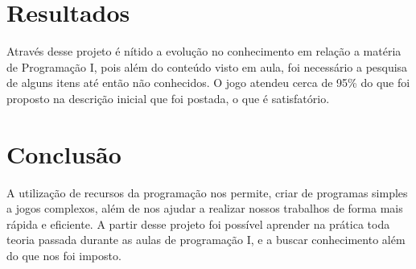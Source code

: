 \documentclass[journal]{IEEEtran}
\begin{document}
\section{Resultados}
Através desse projeto é nítido a evolução no conhecimento em relação a matéria de Programação I, pois além do conteúdo visto em aula, foi necessário a pesquisa de alguns itens até então não conhecidos. O jogo atendeu cerca de 95\% do que foi proposto na descrição inicial que foi postada, o que é satisfatório. 


\section{Conclusão}
A utilização de recursos da programação nos permite, criar de programas simples a jogos complexos, além de nos ajudar a realizar nossos trabalhos de forma mais rápida e eficiente. A partir desse projeto foi possível aprender na prática toda teoria passada durante as aulas de programação I, e a buscar conhecimento além do que nos foi imposto. 











% 
% 
% 
% 
% 
% 
\end{document}
